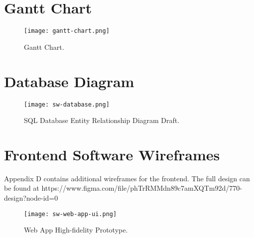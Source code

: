 \chapter{Gantt Chart}

\begin{figure}[!ht]
	\centering
	\texttt{[image: gantt-chart.png]}
	\caption{Gantt Chart.}
	\label{fig:gantt-chart-1}
\end{figure}

\chapter{Database Diagram}

\begin{figure}[!ht]
	\centering
	\texttt{[image: sw-database.png]}
	\caption{SQL Database Entity Relationship Diagram Draft.}
	\label{fig:database-1}
\end{figure}

\chapter{Frontend Software Wireframes}

Appendix D contains additional wireframes for the frontend. The full design can be found at https://www.figma.com/file/phTrRMMdn89c7amXQTm92d/770-design?node-id=0%

\begin{figure}[!ht]
	\centering
	\texttt{[image: sw-web-app-ui.png]}
	\caption{Web App High-fidelity Prototype.}
	\label{fig:webapp-1}
\end{figure}




